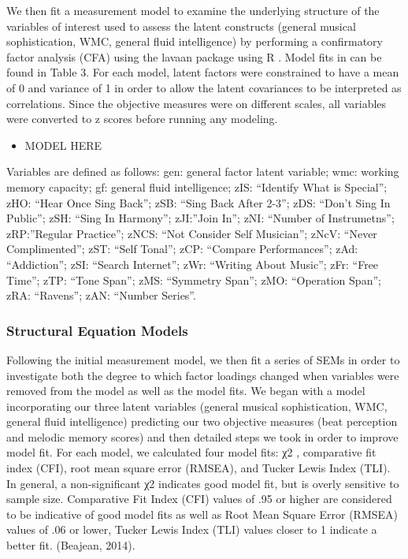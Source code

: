 \documentclass[]{book}
\providecommand{\tightlist}{%
  \setlength{\itemsep}{0pt}\setlength{\parskip}{0pt}}
\begin{document}
We then fit a measurement model to examine the underlying structure of the variables of interest used to assess the latent constructs (general musical sophistication, WMC, general fluid intelligence) by performing a confirmatory factor analysis (CFA) using the lavaan package \citep{rosseelLavaanPackageStructural2012} using R \citep{teamLanguageEnvironmentStatistical2015}.
Model fits in can be found in Table 3.
For each model, latent factors were constrained to have a mean of 0 and variance of 1 in order to allow the latent covariances to be interpreted as correlations.
Since the objective measures were on different scales, all variables were converted to z scores before running any modeling.

\begin{itemize}
\tightlist
\item
  MODEL HERE
\end{itemize}

Variables are defined as follows: gen: general factor latent variable; wmc: working memory capacity; gf: general fluid intelligence; zIS: ``Identify What is Special''; zHO: ``Hear Once Sing Back''; zSB: ``Sing Back After 2-3''; zDS: ``Don't Sing In Public''; zSH: ``Sing In Harmony''; zJI:''Join In''; zNI: ``Number of Instrumetns''; zRP:''Regular Practice''; zNCS: ``Not Consider Self Musician''; zNcV: ``Never Complimented''; zST: ``Self Tonal''; zCP: ``Compare Performances''; zAd: ``Addiction''; zSI: ``Search Internet''; zWr: ``Writing About Music''; zFr: ``Free Time''; zTP: ``Tone Span''; zMS: ``Symmetry Span''; zMO: ``Operation Span''; zRA: ``Ravens''; zAN: ``Number Series''.

\hypertarget{structural-equation-models}{%
\subsubsection{Structural Equation Models}\label{structural-equation-models}}

Following the initial measurement model, we then fit a series of SEMs in order to investigate both the degree to which factor loadings changed when variables were removed from the model as well as the model fits.
We began with a model incorporating our three latent variables (general musical sophistication, WMC, general fluid intelligence) predicting our two objective measures (beat perception and melodic memory scores) and then detailed steps we took in order to improve model fit.
For each model, we calculated four model fits: χ2 , comparative fit index (CFI), root mean square error (RMSEA), and Tucker Lewis Index (TLI).
In general, a non-significant χ2 indicates good model fit, but is overly sensitive to sample size.
Comparative Fit Index (CFI) values of .95 or higher are considered to be indicative of good model fits as well as Root Mean Square Error (RMSEA) values of .06 or lower, Tucker Lewis Index (TLI) values closer to 1 indicate a better fit. (Beajean, 2014).
\end{document}

